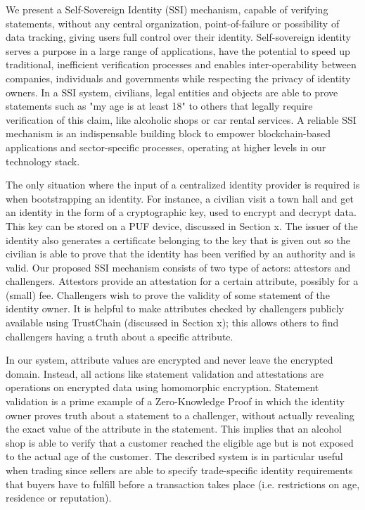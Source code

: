 \documentclass[USenglish]{article}
\begin{document}
We present a Self-Sovereign Identity (SSI) mechanism, capable of verifying statements, without any central organization, point-of-failure or possibility of data tracking, giving users full control over their identity.
Self-sovereign identity serves a purpose in a large range of applications, have the potential to speed up traditional, inefficient verification processes and enables inter-operability between companies, individuals and governments while respecting the privacy of identity owners.
In a SSI system, civilians, legal entities and objects are able to prove statements such as "my age is at least 18" to others that legally require verification of this claim, like alcoholic shops or car rental services.
A reliable SSI mechanism is an indispensable building block to empower blockchain-based applications and sector-specific processes, operating at higher levels in our technology stack.

The only situation where the input of a centralized identity provider is required is when bootstrapping an identity.
For instance, a civilian visit a town hall and get an identity in the form of a cryptographic key, used to encrypt and decrypt data.
This key can be stored on a PUF device, discussed in Section x.
The issuer of the identity also generates a certificate belonging to the key that is given out so the civilian is able to prove that the identity has been verified by an authority and is valid.
Our proposed SSI mechanism consists of two type of actors: attestors and challengers.
Attestors provide an attestation for a certain attribute, possibly for a (small) fee.
Challengers wish to prove the validity of some statement of the identity owner.
It is helpful to make attributes checked by challengers publicly available using TrustChain (discussed in Section x); this allows others to find challengers having a truth about a specific attribute.

In our system, attribute values are encrypted and never leave the encrypted domain.
Instead, all actions like statement validation and attestations are operations on encrypted data using homomorphic encryption.
Statement validation is a prime example of a Zero-Knowledge Proof in which the identity owner proves truth about a statement to a challenger, without actually revealing the exact value of the attribute in the statement.
This implies that an alcohol shop is able to verify that a customer reached the eligible age but is not exposed to the actual age of the customer.
The described system is in particular useful when trading since sellers are able to specify trade-specific identity requirements that buyers have to fulfill before a transaction takes place (i.e. restrictions on age, residence or reputation).
\end{document}
